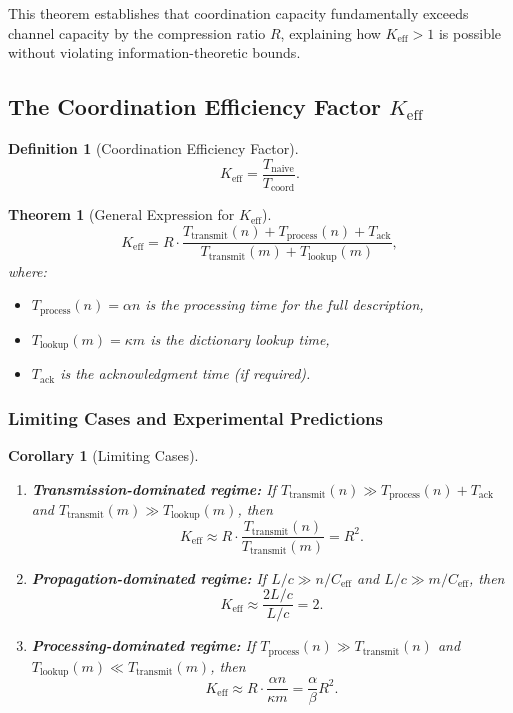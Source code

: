 \documentclass[11pt,a4paper]{article}
\newtheorem{theorem}{Theorem}
\newtheorem{definition}{Definition}
\newtheorem{corollary}{Corollary}
\begin{document}
This theorem establishes that coordination capacity fundamentally exceeds channel capacity by the compression ratio $R$, explaining how $K_{\mathrm{eff}} > 1$ is possible without violating information-theoretic bounds.

\subsection{The Coordination Efficiency Factor $K_{\mathrm{eff}}$}

\begin{definition}[Coordination Efficiency Factor]
	\[
	K_{\mathrm{eff}} = \frac{T_{\text{naive}}}{T_{\text{coord}}}.
	\]
\end{definition}

\begin{theorem}[General Expression for $K_{\mathrm{eff}}$]
	\label{thm:keff-expression}
	\[
	K_{\mathrm{eff}} = R \cdot \frac{T_{\text{transmit}}(n) + T_{\text{process}}(n) + T_{\text{ack}}}{T_{\text{transmit}}(m) + T_{\text{lookup}}(m)},
	\]
	where:
	\begin{itemize}
		\item $T_{\text{process}}(n) = \alpha n$ is the processing time for the full description,
		\item $T_{\text{lookup}}(m) = \kappa m$ is the dictionary lookup time,
		\item $T_{\text{ack}}$ is the acknowledgment time (if required).
	\end{itemize}
\end{theorem}

\subsubsection{Limiting Cases and Experimental Predictions}

\begin{corollary}[Limiting Cases]
	\begin{enumerate}
		\item \textbf{Transmission-dominated regime:} If $T_{\text{transmit}}(n) \gg T_{\text{process}}(n) + T_{\text{ack}}$ and $T_{\text{transmit}}(m) \gg T_{\text{lookup}}(m)$, then
		\[
		K_{\mathrm{eff}} \approx R \cdot \frac{T_{\text{transmit}}(n)}{T_{\text{transmit}}(m)} = R^2.
		\]
		
		\item \textbf{Propagation-dominated regime:} If $L/c \gg n/C_{\text{eff}}$ and $L/c \gg m/C_{\text{eff}}$, then
		\[
		K_{\mathrm{eff}} \approx \frac{2L/c}{L/c} = 2.
		\]
		
		\item \textbf{Processing-dominated regime:} If $T_{\text{process}}(n) \gg T_{\text{transmit}}(n)$ and $T_{\text{lookup}}(m) \ll T_{\text{transmit}}(m)$, then
		\[
		K_{\mathrm{eff}} \approx R \cdot \frac{\alpha n}{\kappa m} = \frac{\alpha}{\beta} R^2.
		\]
	\end{enumerate}
\end{corollary}
\end{document}
